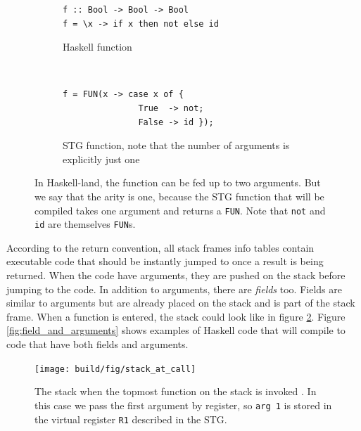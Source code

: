 \begin{figure}
\begin{mdframed}
        \begin{subfigure}[t]{0.5\textwidth}
          \begin{verbatim}
f :: Bool -> Bool -> Bool
f = \x -> if x then not else id
          \end{verbatim}
          \caption{Haskell function}
        \end{subfigure}
    ~ %
        \begin{subfigure}[t]{0.5\textwidth}
          \begin{verbatim}
f = FUN(x -> case x of {
               True  -> not;
               False -> id });
          \end{verbatim}
          \caption{STG function, note that the number of arguments is
explicitly just one}
        \end{subfigure}
  \caption{In Haskell-land, the function can be fed up to two arguments.
  But we say that the arity is one, because the STG function that will be
  compiled takes one argument and returns a \texttt{FUN}. Note that \texttt{not}
  and \texttt{id} are themselves \texttt{FUN}s.
 }
  \label{fig:tricky_arity}
\end{mdframed}
\end{figure}

According to the return convention,
all stack frames info tables contain executable code that should be
instantly jumped to once a result is being returned. \cite{commentary_return_convention} When the code
have arguments, they are pushed on the stack before jumping to the code.
In addition to arguments, there are \emph{fields} too.
Fields are similar to arguments but are already placed on the stack
and is part of the stack frame. When a function is entered,
the stack could look like in figure \ref{fig:stack_at_call}. Figure \ref{fig:field_and_arguments} shows examples
of Haskell code that will compile to code
that have both fields and arguments.

\begin{figure}
\begin{mdframed}
  \texttt{[image: build/fig/stack\_at\_call]}
  \caption{The stack when the topmost function on the stack is invoked \cite{github_stack_at_call}.
In this case we pass the first argument by register, so \texttt{arg 1}
is stored in the virtual register \texttt{R1} described in the STG.}
  \label{fig:stack_at_call}
\end{mdframed}
\end{figure}

